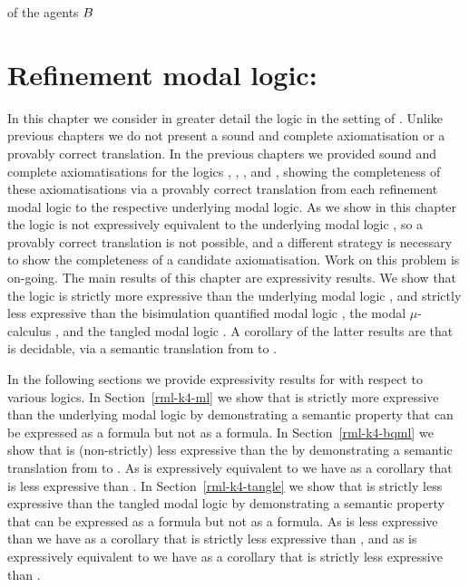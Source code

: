 of the agents $B$ \chapter{Refinement modal logic: \classKF{}}\label{rml-k4}

In this chapter we consider in greater detail the logic \logicRmlKF{} in the setting of \classKF{}.
Unlike previous chapters we do not present a sound and complete axiomatisation or a provably correct translation.
In the previous chapters we provided sound and complete axiomatisations for the logics \logicRmlK{}, \logicRmlKFF{}, \logicRmlKD{}, and \logicRmlS{}, showing the completeness of these axiomatisations via a provably correct translation from each refinement modal logic to the respective underlying modal logic.
As we show in this chapter the logic \logicRmlKF{} is not expressively equivalent to the underlying modal logic \logicKF{}, so a provably correct translation is not possible, and a different strategy is necessary to show the completeness of a candidate axiomatisation.
Work on this problem is on-going.
The main results of this chapter are expressivity results.
We show that the logic \logicRmlKF{} is strictly more expressive than the underlying modal logic \logicKF{}, and strictly less expressive than the bisimulation quantified modal logic \logicBqmlKF{}, the modal $\mu$-calculus \logicMuKF{}, and the tangled modal logic \logicTangleKF{}.
A corollary of the latter results are that \logicRmlKF{} is decidable, via a semantic translation from \langRml{} to \langMu{}.

In the following sections we provide expressivity results for \logicRmlKF{} with respect to various logics.
In Section~\ref{rml-k4-ml} we show that \logicRmlKF{} is strictly more expressive than the underlying modal logic \logicKF{} by demonstrating a semantic property that can be expressed as a \langRml{} formula but not as a \langMl{} formula.
In Section~\ref{rml-k4-bqml} we show that \logicRmlKF{} is (non-strictly) less expressive than the \logicBqmlKF{} by demonstrating a semantic translation from \langRml{} to \langBqml{}.
As \logicBqmlKF{} is expressively equivalent to \logicMuKF{} we have as a corollary that \logicRmlKF{} is less expressive than \logicMuKF{}.
In Section~\ref{rml-k4-tangle} we show that \logicRmlKF{} is strictly less expressive than the tangled modal logic \logicTangleKF{} by demonstrating a semantic property that can be expressed as a \langTangle{} formula but not as a \langRml{} formula.
As \logicTangle{} is less expressive than \logicMuKF{} we have as a corollary that \logicRmlKF{} is strictly less expressive than \logicMuKF{}, and as \logicMuKF{} is expressively equivalent to \logicBqmlKF{} we have as a corollary that \logicRmlKF{} is strictly less expressive than \logicBqmlKF{}.


